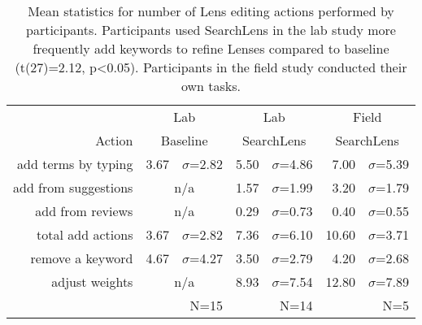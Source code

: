 \begin{table}
  \centering
  \small

\setlength\tabcolsep{4pt} %

  \begin{tabular}{ r | r l | r l |  r l }
  
	&
	\multicolumn{2}{c}{Lab} &
	\multicolumn{2}{c}{Lab} &
	\multicolumn{2}{c}{Field} \\
	
	Action &
	\multicolumn{2}{c}{Baseline} &
	\multicolumn{2}{c}{SearchLens} &
	\multicolumn{2}{c}{SearchLens} \\
    
	\hline
	
    
     
	 add terms by typing &
     3.67 & $\sigma$=2.82 &
     5.50 & $\sigma$=4.86 &
     7.00 & $\sigma$=5.39 \\
     
	 add from suggestions &
	\multicolumn{2}{c|}{n/a} &
     1.57 & $\sigma$=1.99 &
     3.20 & $\sigma$=1.79 \\
     
	 add from reviews &
	\multicolumn{2}{c|}{n/a} &
     0.29 & $\sigma$=0.73 &
     0.40 & $\sigma$=0.55 \\
     
     \hdashline[1pt/1pt]
     
	 total add actions &
     3.67 & $\sigma$=2.82 &
     7.36 & $\sigma$=6.10 &
     10.60 & $\sigma$=3.71 \\
     
     \hline
     
     
	 remove a keyword &
     4.67 & $\sigma$=4.27 &
     3.50 & $\sigma$=2.79 &
     4.20 & $\sigma$=2.68 \\
     
	 adjust weights &
	\multicolumn{2}{c|}{n/a} &
     8.93 & $\sigma$=7.54 &
     12.80 & $\sigma$=7.89 \\
     
	\hline
	
	&
	\multicolumn{2}{r}{N=15} &
	\multicolumn{2}{r}{N=14} &
	\multicolumn{2}{r}{N=5} \\
	
  \end{tabular}
  \caption[Number of Lens editing actions performed under different conditions.]{Mean statistics for number of Lens editing actions performed by participants. Participants used SearchLens in the lab study more frequently add keywords to refine Lenses compared to baseline (t(27)=2.12, p<0.05). Participants in the field study conducted their own tasks. }
  \label{tab:actions}
\end{table}